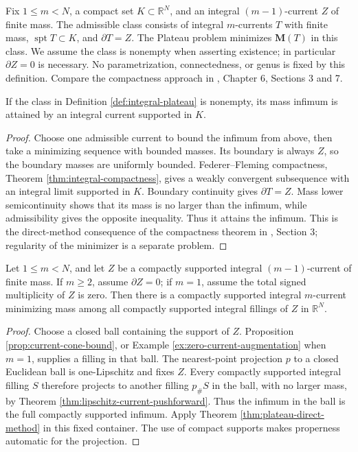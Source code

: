 \begin{definition}\label{def:integral-plateau}
Fix $1\leq m<N$, a compact set $K\subset\mathbb R^N$, and an integral $(m-1)$-current $Z$ of finite mass. The admissible class consists of integral $m$-currents $T$ with finite mass, $\operatorname{spt}T\subset K$, and $\partial T=Z$. The Plateau problem minimizes $\mathbf M(T)$ in this class. We assume the class is nonempty when asserting existence; in particular $\partial Z=0$ is necessary. No parametrization, connectedness, or genus is fixed by this definition. Compare the compactness approach in \cite{Sim18}, Chapter 6, Sections 3 and 7.
\end{definition}

\begin{theorem}\label{thm:plateau-direct-method}
If the class in Definition \ref{def:integral-plateau} is nonempty, its mass infimum is attained by an integral current supported in $K$.
\end{theorem}
\begin{proof}
Choose one admissible current to bound the infimum from above, then take a minimizing sequence with bounded masses. Its boundary is always $Z$, so the boundary masses are uniformly bounded. Federer--Fleming compactness, Theorem \ref{thm:integral-compactness}, gives a weakly convergent subsequence with an integral limit supported in $K$. Boundary continuity gives $\partial T=Z$. Mass lower semicontinuity shows that its mass is no larger than the infimum, while admissibility gives the opposite inequality. Thus it attains the infimum. This is the direct-method consequence of the compactness theorem in \cite{Sim18}, Section 3; regularity of the minimizer is a separate problem.
\end{proof}

\begin{corollary}\label{cor:euclidean-plateau}
Let $1\leq m<N$, and let $Z$ be a compactly supported integral $(m-1)$-current of finite mass. If $m\geq2$, assume $\partial Z=0$; if $m=1$, assume the total signed multiplicity of $Z$ is zero. Then there is a compactly supported integral $m$-current minimizing mass among all compactly supported integral fillings of $Z$ in $\mathbb R^N$.
\end{corollary}
\begin{proof}
Choose a closed ball containing the support of $Z$. Proposition \ref{prop:current-cone-bound}, or Example \ref{ex:zero-current-augmentation} when $m=1$, supplies a filling in that ball. The nearest-point projection $p$ to a closed Euclidean ball is one-Lipschitz and fixes $Z$. Every compactly supported integral filling $S$ therefore projects to another filling $p_\#S$ in the ball, with no larger mass, by Theorem \ref{thm:lipschitz-current-pushforward}. Thus the infimum in the ball is the full compactly supported infimum. Apply Theorem \ref{thm:plateau-direct-method} in this fixed container. The use of compact supports makes properness automatic for the projection.
\end{proof}
